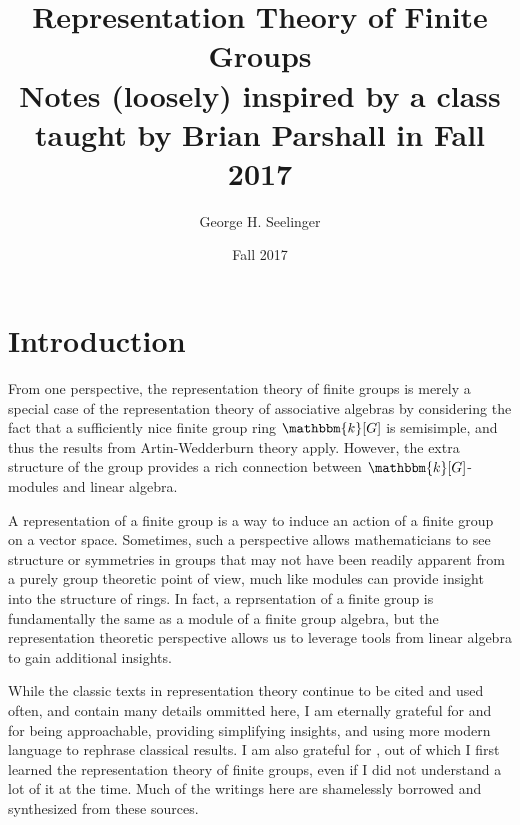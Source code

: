 \documentclass[11pt,leqno,oneside]{amsbook}
\title[Representation Theory of Finite Groups]{Representation Theory
  of Finite Groups \\ Notes
  (loosely) inspired by a class taught by Brian Parshall in Fall 2017}
\author{George H. Seelinger}
\date{Fall 2017}
\newcommand{\bbk}{\mathbbm{k}}
\numberwithin{thm}{section}
\begin{document}
\maketitle
\section{Introduction}
From one perspective, the representation theory of finite groups is merely a
special case of the representation theory of associative algebras by
considering the fact that a sufficiently nice finite group ring \(\bbk[G]\)
is semisimple, and thus the results from Artin-Wedderburn
theory apply. However, the extra structure of the group provides a
rich connection between \(\bbk[G]\)-modules and linear algebra.

A representation of a finite group is a way to induce an action of a
finite group on a vector space. Sometimes, such a perspective allows
mathematicians to see structure or symmetries in groups that may not
have been readily apparent from a purely group theoretic point of
view, much like modules can provide insight into the structure of
rings. In fact, a reprsentation of a finite group is fundamentally the
same as a module of a finite group algebra, but the representation
theoretic perspective allows us to leverage tools from linear algebra
to gain additional insights.

While the classic texts in representation theory continue to be cited
and used often, and contain many details ommitted here, I am eternally
grateful for \cite{etingof} and \cite{smith} for being approachable,
providing simplifying insights, and using more modern language to
rephrase classical results. I am also grateful for \cite{ct}, out of
which I first learned the representation theory of finite groups, even
if I did not understand a lot of it at the time. Much of the writings
here are shamelessly  borrowed and synthesized from these sources.
\end{document}
